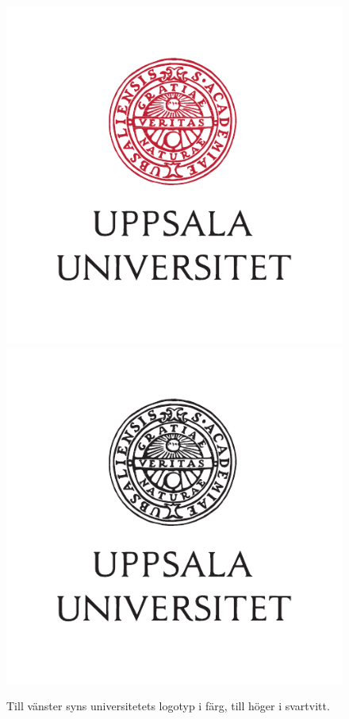 \begin{figure}
\begin{center}
  \includegraphics[height=5\baselineskip]{logo_name.pdf}
\hspace{2cm}
  \includegraphics[height=5\baselineskip]{logo_name_sv.pdf}
\end{center}
\caption{Till vänster syns universitetets logotyp i färg, till höger i svartvitt.}
  \label{fig:exempel}
\end{figure}

